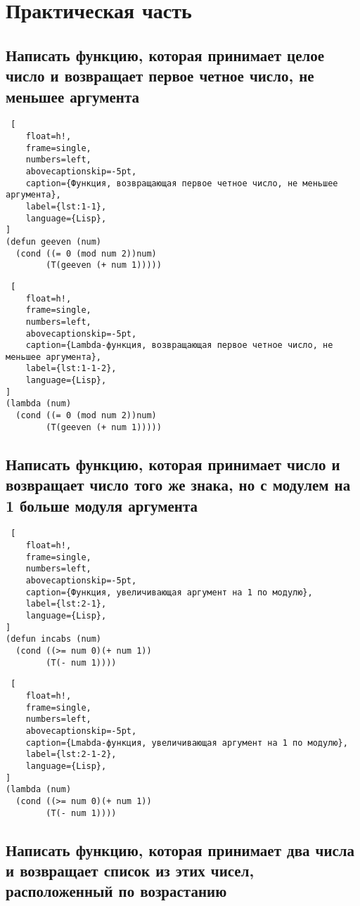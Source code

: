 \chapter{Практическая часть}

\section{Написать функцию, которая принимает целое число и возвращает первое четное число, не меньшее аргумента}

\begin{lstlisting} [
	float=h!,
	frame=single,
	numbers=left,
	abovecaptionskip=-5pt,
	caption={Функция, возвращающая первое четное число, не меньшее аргумента},
	label={lst:1-1},
	language={Lisp},
]
(defun geeven (num) 
  (cond ((= 0 (mod num 2))num)
        (T(geeven (+ num 1)))))
\end{lstlisting}

\begin{lstlisting} [
	float=h!,
	frame=single,
	numbers=left,
	abovecaptionskip=-5pt,
	caption={Lambda-функция, возвращающая первое четное число, не меньшее аргумента},
	label={lst:1-1-2},
	language={Lisp},
]
(lambda (num) 
  (cond ((= 0 (mod num 2))num)
        (T(geeven (+ num 1)))))
\end{lstlisting}

\section{Написать функцию, которая принимает число и возвращает число того же знака, но с модулем на 1 больше модуля аргумента}

\begin{lstlisting} [
	float=h!,
	frame=single,
	numbers=left,
	abovecaptionskip=-5pt,
	caption={Функция, увеличивающая аргумент на 1 по модулю},
	label={lst:2-1},
	language={Lisp},
]
(defun incabs (num)
  (cond ((>= num 0)(+ num 1))
        (T(- num 1))))
\end{lstlisting}

\begin{lstlisting} [
	float=h!,
	frame=single,
	numbers=left,
	abovecaptionskip=-5pt,
	caption={Lmabda-функция, увеличивающая аргумент на 1 по модулю},
	label={lst:2-1-2},
	language={Lisp},
]
(lambda (num)
  (cond ((>= num 0)(+ num 1))
        (T(- num 1))))
\end{lstlisting}

\section{Написать функцию, которая принимает два числа и возвращает список из этих чисел, расположенный по возрастанию}

